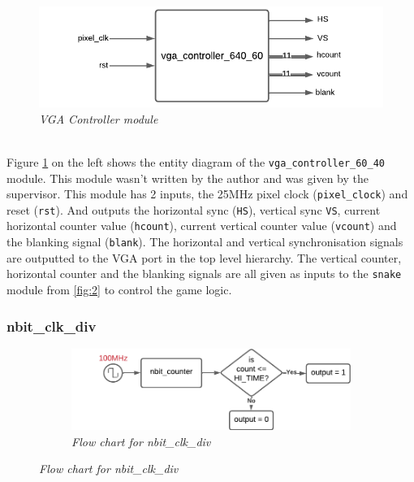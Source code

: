 \documentclass[aps, secnumarabic, balancelastpage, asmath, amssymb, nofootinbib, floatfix,]{revtex4-2}
\begin{document}
{\vspace{-1.5em}
\begin{figure}
    \centering
    \includegraphics[scale = 0.8]{vga_controller.pdf}
    \caption{\em VGA Controller module}
    \label{fig:13}
\end{figure}
~\\
Figure \ref{fig:13} on the left shows the entity diagram of the \verb|vga_controller_60_40| module. This module wasn't written by the author and was given by the supervisor. This module has 2 inputs, the 25MHz pixel clock (\verb|pixel_clock|) and reset (\verb|rst|). And outputs the horizontal sync (\verb|HS|), vertical sync \verb|VS|, current horizontal counter value (\verb|hcount|), current vertical counter value (\verb|vcount|) and the blanking signal (\verb|blank|). The horizontal and vertical synchronisation signals are outputted to the VGA port in the top level hierarchy. The vertical counter, horizontal counter and the blanking signals are all given as inputs to the \verb|snake| module from \ref{fig:2} to control the game logic.

\vspace{-1em}
\subsubsection{\fontsize{10pt}{12pt}\selectfont \bf nbit\_clk\_div \label{sec:2.2.7}}
\vspace{-0.5em}
\begin{figure}[h]
\centering
\captionsetup{justification=centering}
\begin{subfigure}{0.5\textwidth}

  \includegraphics[scale = 0.6]{clk-block.pdf}
  \caption{\em Flow chart for nbit\_clk\_div}


\end{subfigure}
\end{figure}}
\end{document}
